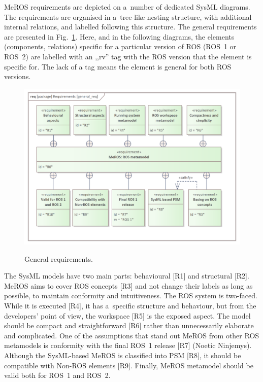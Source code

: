 \documentclass[11pt,oneside,a4paper]{article}
\begin{document}
	MeROS requirements are depicted on a~number of dedicated SysML diagrams. The requirements are organised in a~tree-like nesting structure, with additional internal relations, and labelled following this structure. The general requirements are presented in Fig.~\ref{fig:general_req}. Here, and in the following diagrams, the elements (components, relations) specific for a particular version of ROS (ROS~1 or ROS~2) are labelled with an ,,rv''  tag with the ROS version that the element is specific for. The lack of a tag means the element is general for both ROS versions.
	
	
	\begin{figure}[H]
		\centering
		\begin{center}
			{\includegraphics[scale=0.95]{img/requirement_pkg/general_req.png}}
		\end{center}
		\caption{General requirements.} 
		\label{fig:general_req}
	\end{figure}
	
	
	The SysML models have two main parts: behavioural [R1] and structural [R2]. MeROS aims to cover ROS concepts [R3] and not change their labels as long as possible, to maintain conformity and intuitiveness. The ROS system is two-faced. While it is executed [R4], it has a~specific structure and behaviour, but from the developers' point of view, the workspace [R5] is the exposed aspect. The model should be compact and straightforward [R6] rather than unnecessarily elaborate and complicated. One of the assumptions that stand out MeROS from other ROS metamodels is conformity with the final ROS~1 release [R7] (Noetic Ninjemys). Although the SysML-based MeROS is classified into PSM [R8], it should be compatible with Non-ROS elements [R9]. Finally, MeROS metamodel should be valid both for ROS~1 and ROS~2.
	
\end{document}
